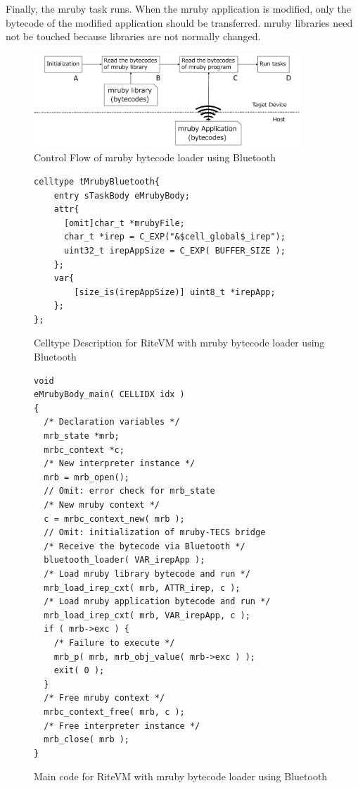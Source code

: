 \documentclass[a4j,12pt,oneside,openany,english]{jsbook}
\begin{document}
Finally, the mruby task runs.
When the mruby application is modified, only the bytecode of the modified application should be transferred.
mruby libraries need not be touched because libraries are not normally changed.
\begin{figure}[t]
    \centering
    \includegraphics[width=10cm,clip]{../EMSOFT2016/figure/control_flow.pdf}
    \caption{Control Flow of mruby bytecode loader using Bluetooth}
    \label{fig:control_flow}
\end{figure}
\begin{figure}[t]
\centering
\begin{lstlisting}
celltype tMrubyBluetooth{
    entry sTaskBody eMrubyBody;
    attr{
      [omit]char_t *mrubyFile;
      char_t *irep = C_EXP("&$cell_global$_irep");
      uint32_t irepAppSize = C_EXP( BUFFER_SIZE );
    };
    var{
        [size_is(irepAppSize)] uint8_t *irepApp;
    };
};
\end{lstlisting}
\caption{Celltype Description for RiteVM with mruby bytecode loader using Bluetooth}
\label{celltype_mrubybluetooth}
\end{figure}
\begin{figure}[t]
\centering
\begin{lstlisting}
void
eMrubyBody_main( CELLIDX idx )
{
  /* Declaration variables */
  mrb_state *mrb;
  mrbc_context *c;
  /* New interpreter instance */
  mrb = mrb_open();
  // Omit: error check for mrb_state
  /* New mruby context */
  c = mrbc_context_new( mrb );
  // Omit: initialization of mruby-TECS bridge
  /* Receive the bytecode via Bluetooth */
  bluetooth_loader( VAR_irepApp );
  /* Load mruby library bytecode and run */
  mrb_load_irep_cxt( mrb, ATTR_irep, c );
  /* Load mruby application bytecode and run */
  mrb_load_irep_cxt( mrb, VAR_irepApp, c );
  if ( mrb->exc ) {
    /* Failure to execute */
    mrb_p( mrb, mrb_obj_value( mrb->exc ) );
    exit( 0 );
  }
  /* Free mruby context */
  mrbc_context_free( mrb, c );
  /* Free interpreter instance */
  mrb_close( mrb );
}

\end{lstlisting}
\caption{Main code for RiteVM with mruby bytecode loader using Bluetooth}
\label{maincode_mrubybluetooth}
\end{figure}
\end{document}
